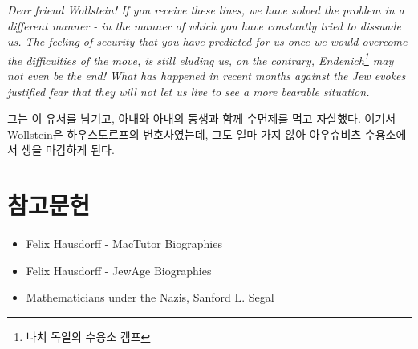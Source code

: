 \documentclass{article}
\begin{document}
    \begin{displayquote}
        \textit{Dear friend Wollstein! If you receive these lines, we have solved the problem in a different manner - in the manner of which you have constantly tried to dissuade us. The feeling of security that you have predicted for us once we would overcome the difficulties of the move, is still eluding us, on the contrary, Endenich\footnote{나치 독일의 수용소 캠프} may not even be the end! What has happened in recent months against the Jew evokes justified fear that they will not let us live to see a more bearable situation.}
    \end{displayquote}

    그는 이 유서를 남기고, 아내와 아내의 동생과 함께 수면제를 먹고 자살했다. 여기서 Wollstein은 하우스도르프의 변호사였는데, 그도 얼마 가지 않아 아우슈비츠 수용소에서 생을 마감하게 된다.









    \section*{참고문헌}

\begin{itemize}
    \item[1] Felix Hausdorff - MacTutor Biographies
    \item[2] Felix Hausdorff - JewAge Biographies
    \item[3] Mathematicians under the Nazis, Sanford L. Segal
\end{itemize}
\end{document}
